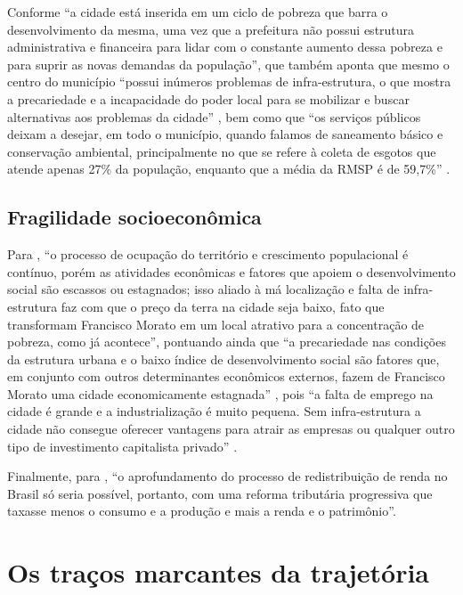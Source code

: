 	Conforme  ``a cidade está inserida em um ciclo de pobreza que barra o desenvolvimento da	mesma, uma vez que a prefeitura não possui estrutura administrativa e financeira para lidar com o constante aumento dessa pobreza e para suprir as novas demandas da população'', que também aponta que mesmo o centro do município ``possui inúmeros problemas de infra-estrutura, o que mostra a precariedade e a incapacidade do poder local para	se mobilizar e buscar alternativas aos problemas da cidade'' \cite[p.61]{cassiele2007a}, bem como que ``os serviços públicos deixam a desejar, em todo o município, quando falamos de saneamento básico e conservação ambiental, principalmente no que se refere à coleta de esgotos que atende apenas 27\% da população, enquanto que a média da RMSP é de 59,7\%'' \cite[p.63]{cassiele2007a}.
	
	\subsection{Fragilidade socioeconômica}
	
	Para , ``o processo de ocupação do território e crescimento populacional é contínuo, porém as atividades econômicas e fatores que apoiem o desenvolvimento social são escassos ou estagnados; isso aliado à má localização e falta de infra-estrutura faz com que o preço da terra na cidade seja baixo, fato que transformam Francisco Morato em um local atrativo para a concentração de pobreza, como já acontece'', pontuando ainda que ``a precariedade nas condições da estrutura urbana e o baixo índice de desenvolvimento
	social são fatores que, em conjunto com outros determinantes econômicos externos, fazem de Francisco Morato uma cidade economicamente estagnada'' \cite[p.92]{cassiele2007a}, pois ``a falta de emprego na cidade é grande e a industrialização é muito pequena. Sem infra-estrutura a cidade não consegue oferecer vantagens para atrair as empresas ou qualquer outro
	tipo de investimento capitalista privado'' \cite[p.99]{cassiele2007a}.
	
	Finalmente, para , ``o aprofundamento do processo de redistribuição de renda no Brasil só seria possível, portanto, com uma reforma tributária progressiva que taxasse menos o consumo e a produção e mais a renda e o patrimônio''.
	
	\section{Os traços marcantes da trajetória} \label{sec:tracos-sumario}
	
